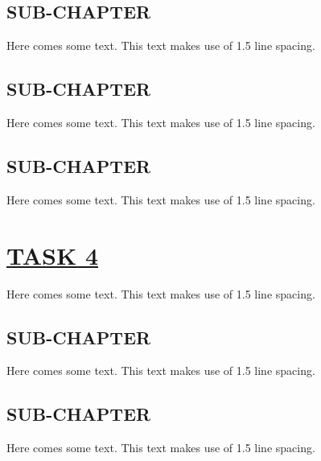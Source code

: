 \documentclass[fontsize=11pt]{scrartcl}
\begin{document}
\subsection{SUB-CHAPTER}
Here comes some text. This text makes use of 1.5 line spacing. 
\subsection{SUB-CHAPTER}
Here comes some text. This text makes use of 1.5 line spacing. 
\subsection{SUB-CHAPTER}
Here comes some text. This text makes use of 1.5 line spacing. 
\pagebreak
\section{\uline{TASK 4}}
Here comes some text. This text makes use of 1.5 line spacing. 
\subsection{SUB-CHAPTER}
Here comes some text. This text makes use of 1.5 line spacing. 
\subsection{SUB-CHAPTER}
Here comes some text. This text makes use of 1.5 line spacing. 
\end{document}
